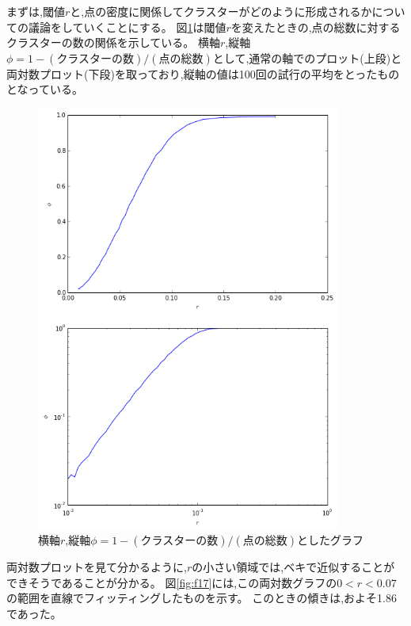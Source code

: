 まずは,閾値$r$と,点の密度に関係してクラスターがどのように形成されるかについての議論をしていくことにする。
図\ref{fig:f16}は閾値$r$を変えたときの,点の総数に対するクラスターの数の関係を示している。
横軸$r$,縦軸$\phi = 1- (\text{クラスターの数})/(\text{点の総数})$として,通常の軸でのプロット(上段)と両対数プロット(下段)を取っており,縦軸の値は100回の試行の平均をとったものとなっている。
\begin{figure}[H]
    \begin{center}
        \includegraphics[width=10cm]{../img/r_phi_1.png}
        \caption{横軸$r$,縦軸$\phi = 1- (\text{クラスターの数})/(\text{点の総数})$としたグラフ}
        \label{fig:f16}
    \end{center}
\end{figure}
両対数プロットを見て分かるように,$r$の小さい領域では,ベキで近似することができそうであることが分かる。
図\ref{fig:f17}には,この両対数グラフの$0<r<0.07$の範囲を直線でフィッティングしたものを示す。
このときの傾きは,およそ1.86であった。


